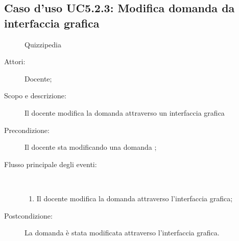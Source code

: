 \subsection{Caso d'uso UC5.2.3: Modifica domanda da interfaccia grafica}
	\begin{figure}[H]
		\centering
		\begin{resizedtikzpicture}{\textwidth}
		\begin{umlsystem}[x=0, fill=lightgray!20]{Quizzipedia}
		\end{umlsystem}
		\end{resizedtikzpicture}
		\caption{}
	\end{figure}
\begin{description}
\item[Attori:] Docente;
\item[Scopo e descrizione:] Il docente modifica la domanda attraverso un interfaccia grafica

      \item[Precondizione:] Il docente sta modificando una domanda
;

        \item[Flusso principale degli eventi:] \ 
 \begin{enumerate}
          \item Il docente modifica la domanda attraverso l'interfaccia grafica;

      \end{enumerate}
    \item[Postcondizione:] La domanda è stata modificata attraverso l'interfaccia grafica.
  \end{description}
\hypertarget{UC5.3}{}
